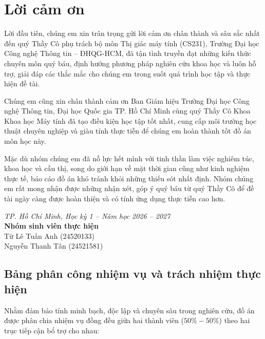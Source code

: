 {}
\section*{Lời cảm ơn}

Lời đầu tiên, chúng em xin trân trọng gửi lời cảm ơn chân thành và sâu sắc nhất đến quý Thầy Cô phụ trách bộ môn Thị giác máy tính (CS231), Trường Đại học Công nghệ Thông tin -- ĐHQG-HCM, đã tận tình truyền đạt những kiến thức chuyên môn quý báu, định hướng phương pháp nghiên cứu khoa học và luôn hỗ trợ, giải đáp các thắc mắc cho chúng em trong suốt quá trình học tập và thực hiện đề tài.

Chúng em cũng xin chân thành cảm ơn Ban Giám hiệu Trường Đại học Công nghệ Thông tin, Đại học Quốc gia TP. Hồ Chí Minh cùng quý Thầy Cô Khoa Khoa học Máy tính đã tạo điều kiện học tập tốt nhất, cung cấp môi trường học thuật chuyên nghiệp và giàu tính thực tiễn để chúng em hoàn thành tốt đồ án môn học này.

Mặc dù nhóm chúng em đã nỗ lực hết mình với tinh thần làm việc nghiêm túc, khoa học và cầu thị, song do giới hạn về mặt thời gian cũng như kinh nghiệm thực tế, báo cáo đồ án khó tránh khỏi những thiếu sót nhất định. Nhóm chúng em rất mong nhận được những nhận xét, góp ý quý báu từ quý Thầy Cô để đề tài ngày càng được hoàn thiện và có tính ứng dụng thực tiễn cao hơn.

\vspace{0.6cm}
\begin{flushright}
\textit{TP. Hồ Chí Minh, Học kỳ 1 -- Năm học 2026 -- 2027}\\[0.2cm]
\textbf{Nhóm sinh vi\^en thực hiện}\\[0.15cm]
Từ Lê Tuấn Anh (24520133)\\
Nguyễn Thanh Tân (24521581)
\end{flushright}

\vspace{0.8cm}
{}
\subsection*{Bảng phân công nhiệm vụ và trách nhiệm thực hiện}

Nhằm đảm bảo tính minh bạch, độc lập và chuyên sâu trong nghiên cứu, đồ án được phân chia nhiệm vụ đồng đều giữa hai thành viên ($50\% - 50\%$) theo hai trục tiếp cận bổ trợ cho nhau:

